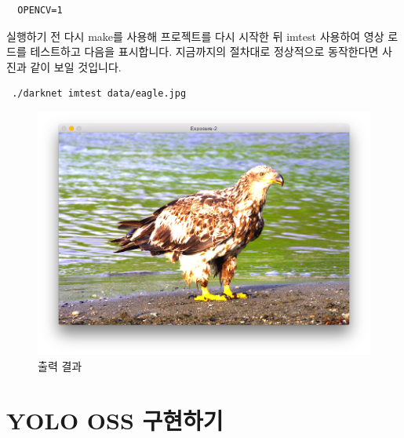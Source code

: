 \documentclass{article}
\begin{document}
\begin{lstlisting}
  OPENCV=1 
\end{lstlisting}
실행하기 전 다시 make를 사용해 프로젝트를 다시 시작한 뒤 imtest 사용하여 영상 로드를 테스트하고 다음을 표시합니다. 지금까지의 절차대로 정상적으로 동작한다면 사진과 같이 보일 것입니다.
\begin{lstlisting}
 ./darknet imtest data/eagle.jpg 
\end{lstlisting}

\begin{figure}[h!]
\centering
\includegraphics[scale=0.13]{egle.png}
\caption{출력 결과}
\label{fig:detect} 
\end{figure}


\section{YOLO OSS 구현하기}
\end{document}

